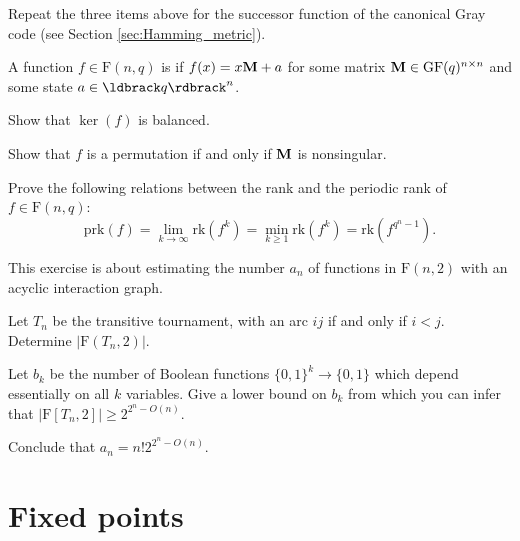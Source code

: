 \documentclass[a4paper, 11pt]{book}
\numberwithin{equation}{section}
\theoremstyle{plain}
\newcommand{\functions}{\mathrm{F}}
\newcommand{\GF}{\mathrm{GF}}
\newcommand{\rank}{\mathrm{rk}}
\newcommand{\periodicRank}{\mathrm{prk}}
\renewcommand{\(}{\ldbrack}
\renewcommand{\)}{\rdbrack}
\newcommand{\BF}[1]{{\bf\boldmath{#1}\unboldmath}}
\begin{document}
\begin{exercises}
\begin{exercises}
	\item Repeat the three items above for the successor function of the canonical Gray code (see Section \ref{sec:Hamming_metric}).
\end{exercises}




\item A function $f \in \functions(n,q)$ is \BF{affine} if $f(x) = x{\bf M} + a$ for some matrix ${\bf M} \in \GF(q)^{n \times n}$ and some state $a \in \(q\)^n$. 
\begin{exercises}
	\item Show that $\ker(f)$ is balanced.
	
	\item Show that $f$ is a permutation if and only if ${\bf M}$ is nonsingular. 
\end{exercises}

\item Prove the following relations between the rank and the periodic rank of $f \in \functions(n,q)$:
\[
	\periodicRank(f) = \lim_{k \to \infty} \rank(f^k) = \min_{k \ge 1} \rank(f^k) = \rank(f^{q^n - 1}).
\]


\item This exercise is about estimating the number $a_n$ of functions in $\functions(n,2)$ with an acyclic interaction graph. 
\begin{exercises}
	\item Let $T_n$ be the transitive tournament, with an arc $ij$ if and only if $i < j$. Determine $|\functions(T_n,2)|$.
	
	\item Let $b_k$ be the number of Boolean functions $\{0,1\}^k \to \{0,1\}$ which depend essentially on all $k$ variables. Give a lower bound on $b_k$ from which you can infer that $|\functions[T_n, 2]| \ge 2^{2^n - O(n)}$.
	
	\item Conclude that
	$
		a_n = n!2^{2^n - O(n)}.
	$
\end{exercises}

\end{exercises}













\part{Fixed points} \label{part:fixed_points}
\end{document}

